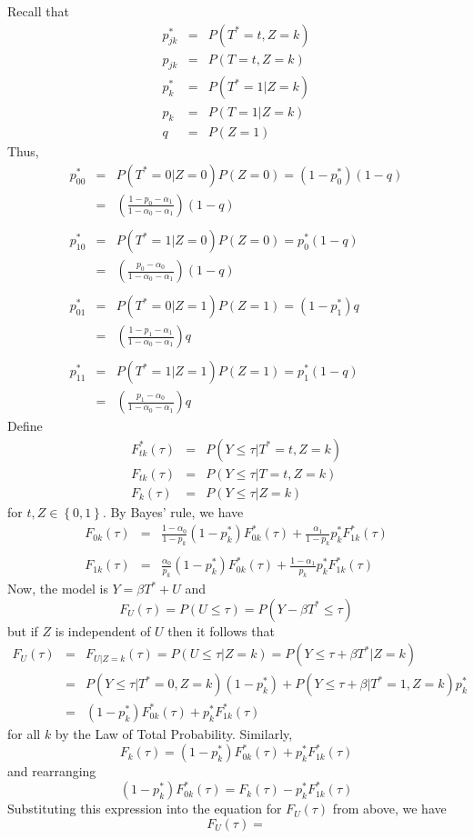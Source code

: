 \documentclass[12pt]{article}
\begin{document}
Recall that
\begin{eqnarray*}
p^*_{jk} &=& P(T^*=t, Z=k)\\
p_{jk} &=& P(T=t, Z=k)\\
p^*_k &=& P(T^* = 1|Z = k)\\
p_k &=& P(T = 1|Z = k)\\
q &=& P(Z = 1)
\end{eqnarray*}
Thus,
\begin{eqnarray*}
  p^*_{00} &=& P(T^* = 0|Z=0)P(Z=0) = (1 - p_0^*)(1 - q)\\
  &=&  \left( \frac{1 - p_0 - \alpha_1}{1 - \alpha_0 - \alpha_1} \right)(1 - q)\\ \\
  p^*_{10} &=& P(T^* = 1|Z=0)P(Z=0) = p_0^*(1 - q) \\
  &=&  \left( \frac{p_0 - \alpha_0}{1 - \alpha_0 - \alpha_1} \right)(1 - q)\\\\
  p^*_{01} &=& P(T^* = 0|Z=1)P(Z=1) = (1 - p_1^*)q\\
  &=&  \left( \frac{1 - p_1 - \alpha_1}{1 - \alpha_0 - \alpha_1} \right) q\\\\
  p^*_{11} &=& P(T^* = 1|Z=1)P(Z=1) = p_1^*(1 - q) \\
  &=&  \left( \frac{p_1 - \alpha_0}{1 - \alpha_0 - \alpha_1} \right)q
\end{eqnarray*}
Define
\begin{eqnarray*}
F_{tk}^*(\tau) &=&  P(Y \leq \tau|T^* = t, Z = k) \\
F_{tk}(\tau) &=&  P(Y \leq \tau|T = t, Z = k)\\
F_k(\tau) &=& P(Y \leq \tau | Z=k) 
\end{eqnarray*}
for $t, Z \in \left\{ 0,1 \right\}$.
By Bayes' rule, we have
\begin{eqnarray*}
  F_{0k}(\tau) &=& \frac{1 - \alpha_0}{1 - p_k} (1 - p^*_k)F_{0k}^*(\tau) + \frac{\alpha_1}{1 - p_k}p_k^* F_{1k}^*(\tau)\\ \\
  F_{1k}(\tau) &=& \frac{ \alpha_0}{p_k}(1 - p_k^*) F_{0k}^*(\tau) + \frac{1 - \alpha_1}{p_k}p_k^* F_{1k}^*(\tau)
\end{eqnarray*}
Now, the model is $Y = \beta T^* + U$ and
\[ F_{U}(\tau) = P(U \leq\tau) = P(Y - \beta T^* \leq \tau)\]
but if $Z$ is independent of $U$ then it follows that
\begin{eqnarray*}
F_U(\tau) &=&  F_{U|Z=k}(\tau) = P(U\leq \tau |Z=k) = P(Y \leq \tau + \beta T^*|Z=k)\\
&=&  P(Y \leq \tau |T^* = 0, Z = k)(1 - p_k^*) + P(Y\leq \tau + \beta| T^* = 1, Z = k)p_k^* \\
&=& (1 - p_k^*) F^*_{0k}(\tau) + p_k^* F^*_{1k}(\tau)
\end{eqnarray*} 
for all $k$ by the Law of Total Probability.
Similarly, 
\[ F_k(\tau) = (1 - p_k^*) F_{0k}^*(\tau)  + p_k^* F_{1k}^*(\tau)\]
and rearranging
\[  (1 - p_k^*) F_{0k}^*(\tau)  = F_k(\tau) - p_k^* F_{1k}^*(\tau)\]
Substituting this expression into the equation for $F_U(\tau)$ from above, we have
\[F_U(\tau) = \]
\end{document}

